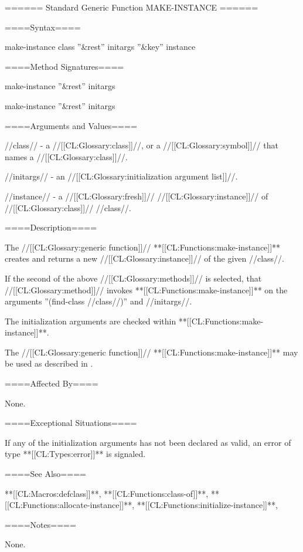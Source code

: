 ====== Standard Generic Function MAKE-INSTANCE ======

====Syntax====


\DefgenWithValues make-instance {class ''&rest'' initargs ''&key'' {\allowotherkeys}} {instance}


====Method Signatures====

\Defmeth make-instance { ''&rest'' initargs}

\Defmeth make-instance { ''&rest'' initargs}

====Arguments and Values====


//class// - a //[[CL:Glossary:class]]//, or a //[[CL:Glossary:symbol]]// that names a //[[CL:Glossary:class]]//.

//initargs// - an //[[CL:Glossary:initialization argument list]]//.

//instance// - a //[[CL:Glossary:fresh]]// //[[CL:Glossary:instance]]// of //[[CL:Glossary:class]]// //class//.

====Description====

The //[[CL:Glossary:generic function]]// **[[CL:Functions:make-instance]]** creates and returns a new //[[CL:Glossary:instance]]// of the given //class//.

If the second of the above //[[CL:Glossary:methods]]// is selected, that //[[CL:Glossary:method]]// invokes **[[CL:Functions:make-instance]]** on the arguments ''(find-class //class//)'' and //initargs//.

The initialization arguments are checked within **[[CL:Functions:make-instance]]**.

The //[[CL:Glossary:generic function]]// **[[CL:Functions:make-instance]]** may be used as described in \secref\ObjectCreationAndInit.

====Affected By====

None.

====Exceptional Situations====

If any of the initialization arguments has not been declared as valid, an error of type **[[CL:Types:error]]** is signaled.

====See Also====

**[[CL:Macros:defclass]]**, **[[CL:Functions:class-of]]**, **[[CL:Functions:allocate-instance]]**, **[[CL:Functions:initialize-instance]]**, {\secref\ObjectCreationAndInit}


====Notes====

None.




